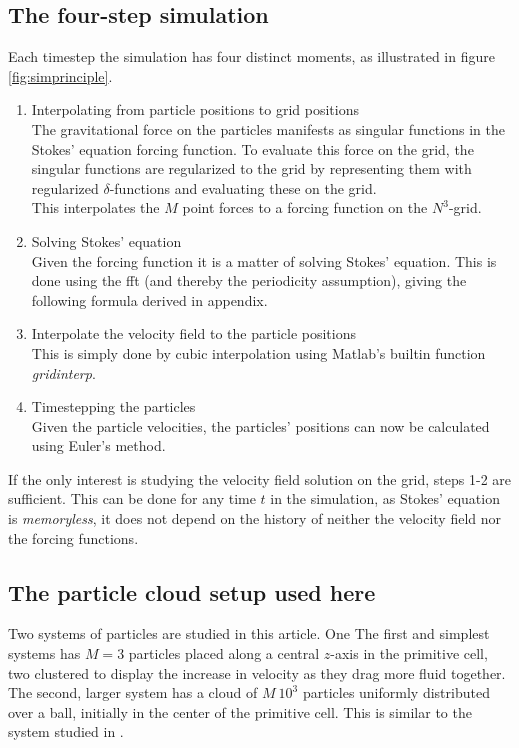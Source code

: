 \documentclass[a4paper,
twoside=false,abstract=false,numbers=noenddot,
titlepage=false,headings=small,parskip=half,version=last]{scrartcl}
\begin{document}
\subsection{The four-step simulation}
Each timestep the simulation has four distinct moments, as illustrated in figure \ref{fig:simprinciple}.
\begin{enumerate}
\item{Interpolating from particle positions to grid positions}\\
The gravitational force on the particles manifests as singular functions in the Stokes' equation forcing function. To evaluate this force on the grid, the singular functions are regularized to the grid by representing them with regularized $\delta$-functions and evaluating these on the grid.\\ This interpolates the $M$ point forces to a forcing function on the $N^3$-grid.

\item{Solving Stokes' equation}\\
Given the forcing function it is a matter of solving Stokes' equation. This is done using the fft (and thereby the periodicity assumption), giving the following formula derived in appendix.

\item{Interpolate the velocity field to the particle positions}\\
This is simply done by cubic interpolation using Matlab's builtin function \emph{gridinterp}.

\item{Timestepping the particles}\\
Given the particle velocities, the particles' positions can now be calculated using Euler's method.
\end{enumerate}
If the only interest is studying the velocity field solution on the grid, steps 1-2 are sufficient. This can be done for any time $t$ in the simulation, as Stokes' equation is \emph{memoryless}, it does not depend on the history of neither the velocity field nor the forcing functions.

\subsection{The particle cloud setup used here}

Two systems of particles are studied in this article.
One 
The first and simplest systems has $M=3$ particles placed along a central $z$-axis in the primitive cell, two clustered to display the increase in velocity as they drag more fluid together.
The second, larger system has a cloud of $M~10^3$ particles uniformly distributed over a ball, initially in the center of the primitive cell. This is similar to the system studied in \cite{fallingclouds}.
\end{document}
